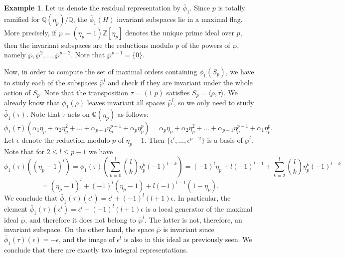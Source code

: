 \documentclass{article}
\theoremstyle{definition}
\newtheorem{ex}[prop]{Example}
\begin{document}
\begin{ex}
    Let us denote the residual representation by $\bar{\phi}_1$.
    Since $p$ is totally ramified for $\mathbb{Q}(\eta_p)/\mathbb{Q}$,
    the $\bar{\phi}_1(H)$ invariant subspaces lie in a maximal flag.
    More precisely, if $\wp=(\eta_p-1)\mathbb{Z}[\eta_p]$ denotes 
    the unique prime ideal over $p$, then the invariant subspaces
    are the reductions modulo $p$ of the powers of $\wp$, namely
    $\bar{\wp},\bar{\wp}^{2},\dots,\bar{\wp}^{p-2}$. 
    Note that $\bar{\wp}^{p-1}=\{0\}$.
    
    Now, in order to compute the set of maximal orders containing 
    $\phi_1(S_p)$, we have to study each of the subspaces 
    $\bar{\wp}^{l}$ and 
    check if they are invariant under the whole action of $S_p$. 
    Note that the
    transposition $\tau=(1\;p)$ satisfies 
    $S_p=\langle\rho,\tau\rangle$. We 
    already know that $\bar{\phi}_1(\rho)$ leaves invariant all spaces 
    $\bar{\wp}^{l}$, so we only need to study $\bar{\phi}_1(\tau)$. 
    Note that $\tau$ acts on $\mathbb{Q}(\eta_p)$ as follows: 
    $$\phi_1(\tau)(\alpha_1\eta_p+\alpha_2\eta_p^2+\dots+
    \alpha_{p-1}\eta_p^{p-1}+\alpha_p\eta_p^p)=
    \alpha_p\eta_p+\alpha_2\eta_p^2+
    \dots+\alpha_{p-1}\eta_p^{p-1}+\alpha_1\eta_p^p.$$
    Let $\epsilon$ denote the reduction modulo $p$ of $\eta_p-1$. 
    Then $\{\epsilon^l,\dots,\epsilon^{p-2}\}$ is a basis
    of $\bar{\wp}^l$. 
    Note that for $2\leq l \leq p-1$ we have
    $$\phi_1(\tau)\left((\eta_p-1)^l\right)=\phi_1(\tau)
    \left(\sum_{k=0}^{l}\binom{l}{k}\eta_p^{k}(-1)^{l-k}\right)=
    (-1)^l\eta_p+l(-1)^{l-1}+
    \sum_{k=2}^{l}\binom{l}{k}\eta_p^{k}(-1)^{l-k}$$
    $$=(\eta_p-1)^{l}+(-1)^{l}(\eta_p-1)+l(-1)^{l-1}(1-\eta_p).$$
    We conclude that $\bar{\phi}_1(\tau)\left(\epsilon^l\right)=\epsilon^l
    +(-1)^l(l+1)\epsilon$. In particular, the element 
    $\bar{\phi}_1(\tau)\left(\epsilon^{l}\right)
    =\epsilon^l+(-1)^l(l+1)\epsilon$ is a local generator
    of the maximal ideal
    $\bar{\wp}$, and therefore it does not belong to 
    $\bar{\wp}^l$. The latter
    is not, therefore, an invariant subspace. On the other hand, 
    the space $\bar{\wp}$ is invariant since 
    $\bar{\phi}_1(\tau)(\epsilon)=-\epsilon$,
    and the image of $\epsilon^{l}$ is also in this ideal 
    as previously seen.
    We conclude that there are exactly two integral representations. 
\end{ex}
\end{document}
